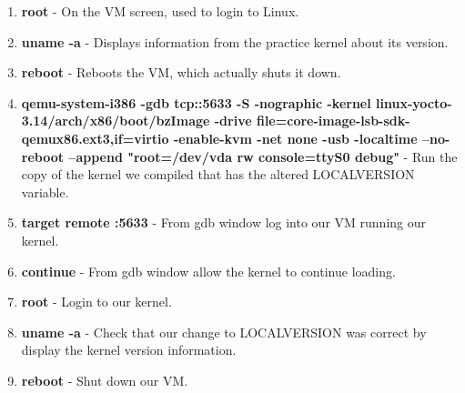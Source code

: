 \documentclass[10pt,draftclsnofoot,onecolumn, compsoc]{IEEEtran}
\begin{document}
\begin{enumerate}
	\item {\bf root} - On the VM screen, used to login to Linux.
	\item {\bf uname -a} - Displays information from the practice kernel about its version.
	\item {\bf reboot} - Reboots the VM, which actually shuts it down.
	\item {\bf qemu-system-i386 -gdb tcp::5633 -S -nographic -kernel linux-yocto-3.14/arch/x86/boot/bzImage -drive file=core-image-lsb-sdk- qemux86.ext3,if=virtio -enable-kvm -net none -usb -localtime --no-reboot --append "root=/dev/vda rw console=ttyS0 debug"} - Run the copy of the kernel we compiled that has the altered LOCALVERSION variable.
	\item {\bf target remote :5633} - From gdb window log into our VM running our kernel.
	\item {\bf continue} - From gdb window allow the kernel to continue loading.\
	\item {\bf root} - Login to our kernel.
	\item {\bf uname -a} - Check that our change to LOCALVERSION was correct by display the kernel version information.
	\item {\bf reboot} - Shut down our VM.
\end{enumerate}
\end{document}
